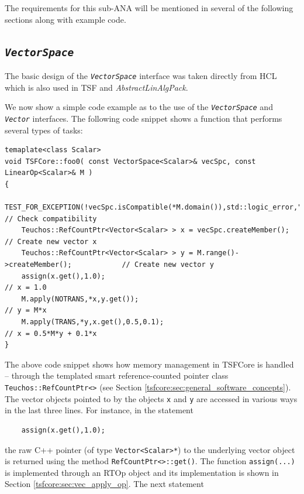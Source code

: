 The requirements for this sub-ANA will be mentioned in several of the
following sections along with example code.

%
\subsection{\texttt{\textit{VectorSpace}}}
\label{tsfcore:sec:vec_space}
%

The basic design of the \texttt{\textit{VectorSpace}} interface was
taken directly from HCL which is also used in TSF and
\textit{AbstractLinAlgPack}.

We now show a simple code example as to the use of the
\texttt{\textit{VectorSpace}} and
\texttt{\textit{Vector}} interfaces.  The following code snippet shows
a function that performs several types of tasks:

{\scriptsize\begin{verbatim}
temaplate<class Scalar>
void TSFCore::foo0( const VectorSpace<Scalar>& vecSpc, const LinearOp<Scalar>& M )
{
    TEST_FOR_EXCEPTION(!vecSpc.isCompatible(*M.domain()),std::logic_error,"Error!"); // Check compatibility
    Teuchos::RefCountPtr<Vector<Scalar> > x = vecSpc.createMember();                // Create new vector x
    Teuchos::RefCountPtr<Vector<Scalar> > y = M.range()->createMember();            // Create new vector y
    assign(x.get(),1.0);                                                          // x = 1.0
    M.apply(NOTRANS,*x,y.get());                                                  // y = M*x
    M.apply(TRANS,*y,x.get(),0.5,0.1);                                            // x = 0.5*M*y + 0.1*x
}
\end{verbatim}}

\noindent The above code snippet shows how memory management in TSFCore is
handled -- through the templated smart reference-counted pointer class
\texttt{Teuchos\-::RefCountPtr<>} (see Section
\ref{tsfcore:sec:general_software_concepts}).  The vector objects pointed
to by the objects \texttt{x} and \texttt{y} are accessed in various
ways in the last three lines.  For instance, in the statement

{\scriptsize\begin{verbatim}
    assign(x.get(),1.0);
\end{verbatim}}

\noindent
the raw C++ pointer (of type \texttt{Vector<Scalar>*}) to the
underlying vector object is returned using the method
\texttt{RefCountPtr<>\-::get()}.  The function
\texttt{assign(...)} is implemented through an RTOp object and its
implementation is shown in Section \ref{tsfcore:sec:vec_apply_op}.
The next statement

